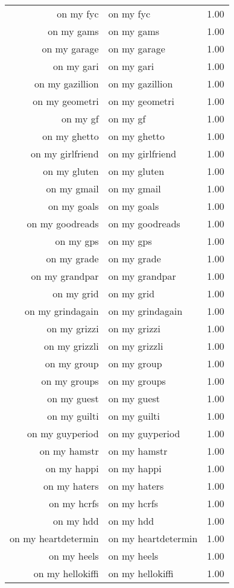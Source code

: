 \begin{table}[ht]
\begin{tabular}{rlr}
  on my fyc & on my fyc & 1.00 \\ 
  on my gams & on my gams & 1.00 \\ 
  on my garage & on my garage & 1.00 \\ 
  on my gari & on my gari & 1.00 \\ 
  on my gazillion & on my gazillion & 1.00 \\ 
  on my geometri & on my geometri & 1.00 \\ 
  on my gf & on my gf & 1.00 \\ 
  on my ghetto & on my ghetto & 1.00 \\ 
  on my girlfriend & on my girlfriend & 1.00 \\ 
  on my gluten & on my gluten & 1.00 \\ 
  on my gmail & on my gmail & 1.00 \\ 
  on my goals & on my goals & 1.00 \\ 
  on my goodreads & on my goodreads & 1.00 \\ 
  on my gps & on my gps & 1.00 \\ 
  on my grade & on my grade & 1.00 \\ 
  on my grandpar & on my grandpar & 1.00 \\ 
  on my grid & on my grid & 1.00 \\ 
  on my grindagain & on my grindagain & 1.00 \\ 
  on my grizzi & on my grizzi & 1.00 \\ 
  on my grizzli & on my grizzli & 1.00 \\ 
  on my group & on my group & 1.00 \\ 
  on my groups & on my groups & 1.00 \\ 
  on my guest & on my guest & 1.00 \\ 
  on my guilti & on my guilti & 1.00 \\ 
  on my guyperiod & on my guyperiod & 1.00 \\ 
  on my hamstr & on my hamstr & 1.00 \\ 
  on my happi & on my happi & 1.00 \\ 
  on my haters & on my haters & 1.00 \\ 
  on my hcrfs & on my hcrfs & 1.00 \\ 
  on my hdd & on my hdd & 1.00 \\ 
  on my heartdetermin & on my heartdetermin & 1.00 \\ 
  on my heels & on my heels & 1.00 \\ 
  on my hellokiffi & on my hellokiffi & 1.00 \\ 

\end{tabular}
\end{table}
